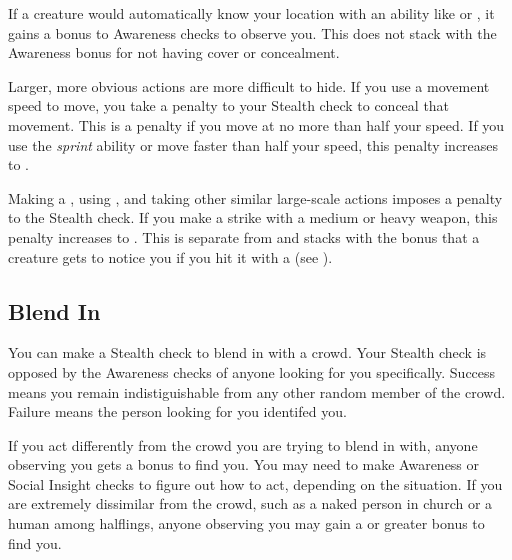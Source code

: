         If a creature would automatically know your location with an ability like  or , it gains a  bonus to Awareness checks to observe you.
        This does not stack with the Awareness bonus for not having cover or concealment.

        Larger, more obvious actions are more difficult to hide.
        If you use a movement speed to move, you take a penalty to your Stealth check to conceal that movement.
        This is a  penalty if you move at no more than half your speed.
        If you use the \textit{sprint} ability or move faster than half your speed, this penalty increases to .

        Making a , using , and taking other similar large-scale actions imposes a  penalty to the Stealth check.
        If you make a strike with a medium or heavy weapon, this penalty increases to .
        This is separate from and stacks with the  bonus that a creature gets to notice you if you hit it with a  (see ).

    \subsection{Blend In}
        You can make a Stealth check to blend in with a crowd. Your Stealth check is opposed by the Awareness checks of anyone looking for you specifically. Success means you remain indistiguishable from any other random member of the crowd. Failure means the person looking for you identifed you.

        If you act differently from the crowd you are trying to blend in with, anyone observing you gets a  bonus to find you. You may need to make Awareness or Social Insight checks to figure out how to act, depending on the situation. If you are extremely dissimilar from the crowd, such as a naked person in church or a human among halflings, anyone observing you may gain a  or greater bonus to find you.

